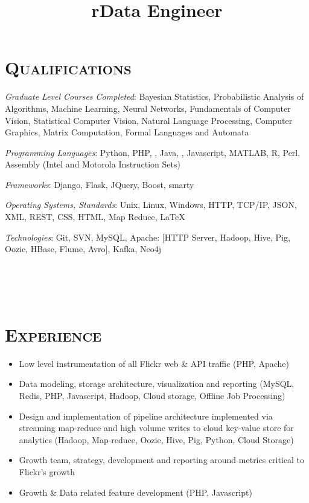 \begin{resume}

\section{\textsc{Qualifications}}

\emph{Graduate Level Courses Completed}: Bayesian Statistics, Probabilistic Analysis of Algorithms, Machine Learning, Neural Networks, Fundamentals of Computer Vision, Statistical Computer Vision, Natural Language Processing, Computer Graphics, Matrix Computation, Formal Languages and Automata   

\emph{Programming Languages}: Python, PHP, \Cplusplus, Java, \CSharp, Javascript, MATLAB, R, Perl, Assembly (Intel and Motorola Instruction Sets)

\emph{Frameworks}: Django, Flask, JQuery, Boost, smarty

\emph{Operating Systems, Standards}: Unix, Linux, Windows, HTTP, TCP/IP, JSON, XML, REST, CSS, HTML, Map Reduce, \LaTeX 

\emph{Technologies}: Git, SVN, MySQL, Apache: [HTTP Server, Hadoop, Hive, Pig, Oozie, HBase, Flume, Avro], Kafka, Neo4j



\begin{formatb}
  \title{r}\\
  \\   
  \body\\
\end{formatb}

\section{\textsc{Experience}}

\title{Data Engineer}
\begin{position}
\vspace{-8pt}
\begin{itemize}
  \item Low level instrumentation of all Flickr web \& API traffic (PHP, Apache)
  \item Data modeling, storage architecture, visualization and reporting (MySQL, Redis, PHP, Javascript, Hadoop, Cloud storage, Offline Job Processing)
  \item Design and implementation of pipeline architecture implemented via streaming map-reduce and high volume writes to cloud key-value store for analytics (Hadoop, Map-reduce, Oozie, Hive, Pig, Python, Cloud Storage)
  \item Growth team, strategy, development and reporting around metrics critical to Flickr's growth
  \item Growth \& Data related feature development (PHP, Javascript)
\end{itemize}
\vspace{4pt}
\end{position}


\end{resume}
